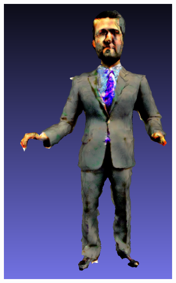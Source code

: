 \begin{figure}[H]
\begin{subfigure}[b]{0.114\textwidth}
        \caption{}
    \end{subfigure}
    \begin{subfigure}[b]{0.2059\textwidth}
        \centering
        \includegraphics[width=\textwidth]{figures/future/bias_ceo_fantasia3d.png}
        \caption{}
    \end{subfigure}
    \begin{subfigure}[b]{0.106\textwidth}
        \centering

\end{subfigure}
\end{figure}
